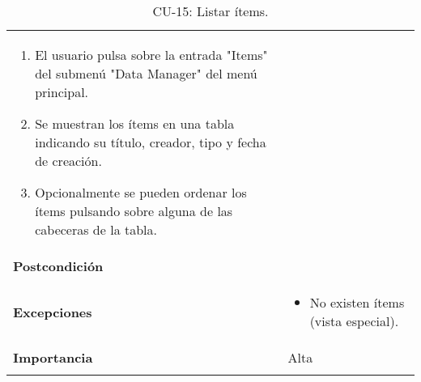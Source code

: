 \begin{longtable}[]{@{}ll@{}}
\begin{minipage}[t]{0.75\columnwidth}
\begin{enumerate}
\def\labelenumi{\arabic{enumi}.}
\tightlist
\item
  El usuario pulsa sobre la entrada "Items" del submenú "Data Manager"
  del menú principal.
\item
  Se muestran los ítems en una tabla indicando su título, creador, tipo
  y fecha de creación.
\item
  Opcionalmente se pueden ordenar los ítems pulsando sobre alguna de las
  cabeceras de la tabla.
\end{enumerate}\strut
\end{minipage}\tabularnewline
\begin{minipage}[t]{0.19\columnwidth}\raggedright
\textbf{Postcondición}\strut
\end{minipage} & \begin{minipage}[t]{0.75\columnwidth}\raggedright
\strut
\end{minipage}\tabularnewline
\begin{minipage}[t]{0.19\columnwidth}\raggedright
\textbf{Excepciones}\strut
\end{minipage} & \begin{minipage}[t]{0.75\columnwidth}\raggedright
\begin{itemize}
\tightlist
\item
  No existen ítems (vista especial).
\end{itemize}\strut
\end{minipage}\tabularnewline
\begin{minipage}[t]{0.19\columnwidth}\raggedright
\textbf{Importancia}\strut
\end{minipage} & \begin{minipage}[t]{0.75\columnwidth}\raggedright
Alta\strut
\end{minipage}\tabularnewline
\bottomrule
\caption{CU-15: Listar ítems.}
\end{longtable}

